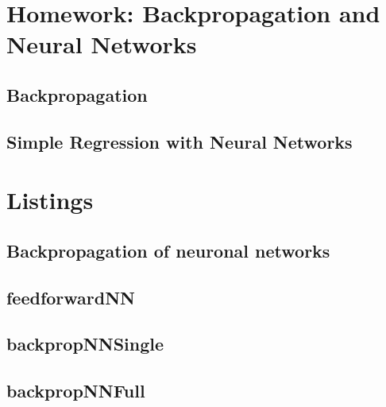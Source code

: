 
\chapter{Homework: Backpropagation and Neural Networks}
\section{Backpropagation}

\clearpage
\newpage
\section{Simple Regression with Neural Networks}



\clearpage
\newpage

\chapter{Listings}
\section{Backpropagation of neuronal networks}

\section{feedforwardNN}

\section{backpropNNSingle}

\section{backpropNNFull}







%
%

\FloatBarrier\label{end-of-document}



